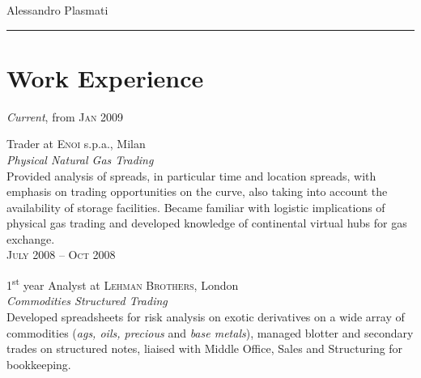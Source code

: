 \documentclass[10pt]{article}
\begin{document}
\color{text1} %

	\par{\centering
		{\sffamily\Huge Alessandro Plasmati
	}\\[25pt]\par	
	{\color{white} \hrule} %
	
\begin{minipage}[t]{0.5\textwidth} %

	\vspace{0pt}	%
	
\section{Work Experience}

	\raggedleft
	\emph{Current}, from \textsc{Jan 2009}\par

	\raggedright\large Trader at \textsc{Enoi} s.p.a., Milan\\
	\emph{Physical Natural Gas Trading}\\[5pt]

	\normalsize{Provided analysis of spreads, in particular time and location spreads, with emphasis on trading opportunities on the curve, also taking into account the availability of storage facilities. Became familiar with logistic implications of physical gas trading and developed knowledge of continental virtual hubs for gas exchange.}\\[10pt]

	\raggedleft
	\textsc{\normalsize July 2008 -- Oct 2008}\par

	\raggedright
	\large 1\textsuperscript{st} year Analyst at \textsc{Lehman Brothers}, London\\
\emph{Commodities Structured Trading}\\[5pt]

\normalsize{Developed spreadsheets for risk analysis on exotic derivatives on a wide array of commodities (\textit{ags, oils, precious} and \textit{base metals}), managed blotter and secondary trades on structured notes, liaised with Middle Office, Sales and Structuring for bookkeeping.}\\[10pt]


\end{minipage}}
\end{document}
